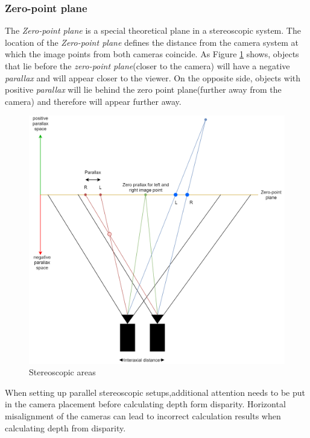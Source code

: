 \subsubsection{Zero-point plane}
The\textit{ Zero-point plane} is a special theoretical plane in a stereoscopic system. The location of the  \textit{Zero-point plane} defines the distance from the camera system at which the image points from both cameras coincide. As Figure \ref{img:stereo_diagram} shows, objects that lie before the \textit{zero-point plane}(closer to the camera) will have a negative \textit{parallax} and will appear closer to the viewer. On the opposite side, objects with positive \textit{parallax} will lie behind the zero point plane(further away from the camera) and therefore will appear further away.
\begin{figure}[H]
\includegraphics[width=\textwidth]{images/Stereo_diagram.png}
\caption{Stereoscopic areas}
\label{img:stereo_diagram} 
\end{figure}
When setting up parallel stereoscopic setups,additional attention needs to be put in the camera placement before calculating depth form disparity. Horizontal misalignment of the cameras can lead to incorrect calculation results when calculating depth from disparity.
